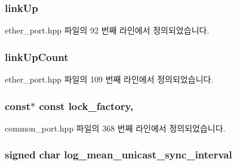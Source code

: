 \subsubsection[{\texorpdfstring{link\+Up}{linkUp}}]{ link\+Up\hspace{0.3cm}{\ttfamily [private]}}\hypertarget{class_ether_port_a3e5a0a3ec08db1c42b0f090083c8818d}{}\label{class_ether_port_a3e5a0a3ec08db1c42b0f090083c8818d}


ether\+\_\+port.\+hpp 파일의 92 번째 라인에서 정의되었습니다.

\subsubsection[{\texorpdfstring{link\+Up\+Count}{linkUpCount}}]{ link\+Up\+Count\hspace{0.3cm}{\ttfamily [private]}}\hypertarget{class_ether_port_ac7f33022bc67fd0d956d7250e283d2e3}{}\label{class_ether_port_ac7f33022bc67fd0d956d7250e283d2e3}


ether\+\_\+port.\+hpp 파일의 109 번째 라인에서 정의되었습니다.

\subsubsection[{\texorpdfstring{lock\+\_\+factory}{lock_factory}}]{ const$\ast$ const lock\+\_\+factory\hspace{0.3cm}{\ttfamily [protected]}, {\ttfamily [inherited]}}\hypertarget{class_common_port_a79c67e28bcaacaa0f11c04682d085b36}{}\label{class_common_port_a79c67e28bcaacaa0f11c04682d085b36}


common\+\_\+port.\+hpp 파일의 368 번째 라인에서 정의되었습니다.

\subsubsection[{\texorpdfstring{log\+\_\+mean\+\_\+unicast\+\_\+sync\+\_\+interval}{log_mean_unicast_sync_interval}}]{\setlength{\rightskip}{0pt plus 5cm}signed char log\+\_\+mean\+\_\+unicast\+\_\+sync\+\_\+interval\hspace{0.3cm}{\ttfamily [private]}}\hypertarget{class_ether_port_aaa9b3813ab73e017887e3836b349fcbe}{}\label{class_ether_port_aaa9b3813ab73e017887e3836b349fcbe}


